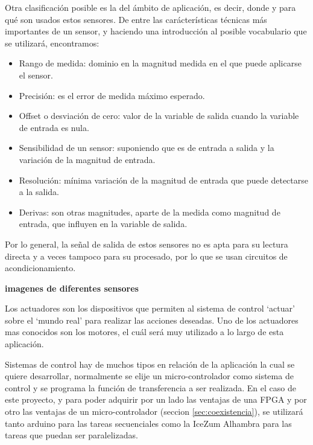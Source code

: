 Otra clasificación posible es la del ámbito de aplicación, es decir, donde y para qué son usados estos sensores. \newline
De entre las carácterísticas técnicas más importantes de un sensor, y haciendo una introducción al posible vocabulario que se utilizará, encontramos:

\begin{itemize}
	\item Rango de medida:  dominio en la magnitud medida en el que puede aplicarse el sensor.
	\item Precisión: es el error de medida máximo esperado.
	\item Offset o desviación de cero: valor de la variable de salida cuando la variable de entrada es nula.
	\item Sensibilidad de un sensor: suponiendo que es de entrada a salida y la variación de la magnitud de entrada.
	\item Resolución: mínima variación de la magnitud de entrada que puede detectarse a la salida.
	\item Derivas: son otras magnitudes, aparte de la medida como magnitud de entrada, que influyen en la variable de salida.
\end{itemize}

Por lo general, la señal de salida de estos sensores no es apta para su lectura directa y a veces tampoco para su procesado, por lo que se usan circuitos de acondicionamiento. 

\textbf{imagenes de diferentes sensores}

Los actuadores son los dispositivos que permiten al sistema de control ‘actuar’ sobre el ‘mundo real’ para realizar las acciones deseadas. Uno de los actuadores mas conocidos son los motores, el cuál será muy utilizado a lo largo de esta aplicación.  \newline

Sistemas de control hay de muchos tipos en relación de la aplicación la cual se quiere desarrollar, normalmente se elije un micro-controlador como sistema de control y se programa la función de transferencia a ser realizada.\newline
En el caso de este proyecto, y para poder adquirir por un lado las ventajas de una FPGA y por otro las ventajas de un micro-controlador (seccion \ref{sec:coexistencia}), se utilizará tanto arduino para las tareas secuenciales como la IceZum Alhambra para las tareas que puedan ser paralelizadas. \newline


